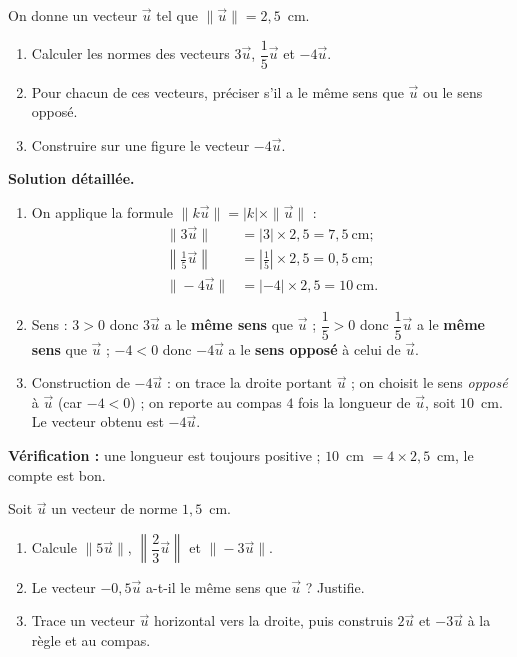 \documentclass[11pt]{article}
\begin{document}
\begin{exoresolu}
On donne un vecteur $\vec{u}$ tel que $\|\vec{u}\| = 2{,}5$~cm.
\begin{enumerate}
\item Calculer les normes des vecteurs $3\vec{u}$, $\dfrac{1}{5}\vec{u}$ et $-4\vec{u}$.
\item Pour chacun de ces vecteurs, préciser s'il a le même sens que $\vec{u}$ ou le sens opposé.
\item Construire sur une figure le vecteur $-4\vec{u}$.
\end{enumerate}
\tcblower
\textbf{Solution détaillée.}
\begin{enumerate}
\item On applique la formule $\|k\vec{u}\| = |k| \times \|\vec{u}\|$ :
\begin{align*}
\|3\vec{u}\| &= |3| \times 2{,}5 = 7{,}5~\text{cm} ;\\
\left\|\tfrac{1}{5}\vec{u}\right\| &= \left|\tfrac{1}{5}\right| \times 2{,}5 = 0{,}5~\text{cm} ;\\
\|-4\vec{u}\| &= |-4| \times 2{,}5 = 10~\text{cm}.
\end{align*}
\item Sens : $3 > 0$ donc $3\vec{u}$ a le \textbf{même sens} que $\vec{u}$ ; $\dfrac{1}{5} > 0$ donc $\dfrac{1}{5}\vec{u}$ a le \textbf{même sens} que $\vec{u}$ ; $-4 < 0$ donc $-4\vec{u}$ a le \textbf{sens opposé} à celui de $\vec{u}$.
\item Construction de $-4\vec{u}$ : on trace la droite portant $\vec{u}$ ; on choisit le sens \emph{opposé} à $\vec{u}$ (car $-4 < 0$) ; on reporte au compas $4$ fois la longueur de $\vec{u}$, soit $10$~cm. Le vecteur obtenu est $-4\vec{u}$.
\end{enumerate}
\textbf{Vérification :} une longueur est toujours positive ; $10$~cm $= 4 \times 2{,}5$~cm, le compte est bon.
\end{exoresolu}

\begin{exercice}
Soit $\vec{u}$ un vecteur de norme $1{,}5$~cm.
\begin{enumerate}
\item Calcule $\|5\vec{u}\|$, $\left\|\dfrac{2}{3}\vec{u}\right\|$ et $\|-3\vec{u}\|$.
\item Le vecteur $-0{,}5\vec{u}$ a-t-il le même sens que $\vec{u}$ ? Justifie.
\item Trace un vecteur $\vec{u}$ horizontal vers la droite, puis construis $2\vec{u}$ et $-3\vec{u}$ à la règle et au compas.
\end{enumerate}
\end{exercice}
\end{document}

